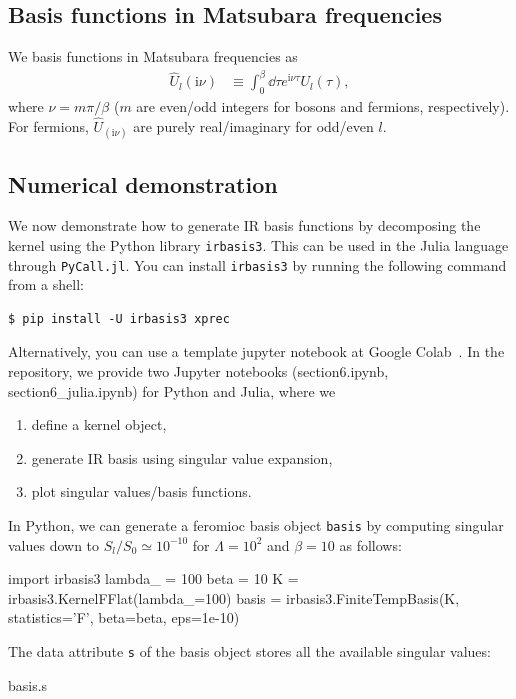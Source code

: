 \documentclass[submission, LectureNotes]{SciPost}
\newcommand\ii{\mathrm{i}}%
\newcommand\iv{\ii\nu}%
\begin{document}
\subsection{Basis functions in Matsubara frequencies}
We basis functions in Matsubara frequencies as
\begin{align}
    \hat{U}_l(\iv) &\equiv \int_0^\beta \dd \tau e^{\iv\tau} U_l(\tau),
\end{align}
where $\nu = m\pi/\beta$ ($m$ are even/odd integers for bosons and fermions, respectively).
For fermions, $\hat{U}_(\iv)$ are purely real/imaginary for odd/even $l$.

\subsection{Numerical demonstration}
We now demonstrate how to generate IR basis functions by decomposing the kernel using the Python library
\texttt{irbasis3}.
This can be used in the Julia language through \texttt{PyCall.jl}.
You can install \texttt{irbasis3} by running the following command from a shell:
\begin{verbatim}
$ pip install -U irbasis3 xprec
\end{verbatim}
Alternatively, you can use a template jupyter notebook at Google Colab~\cite{colab-template}.
In the repository, we provide two Jupyter notebooks (section6.ipynb, section6\_julia.ipynb)
for Python and Julia, where we
\begin{enumerate}
    \item define a kernel object,
    \item generate IR basis using singular value expansion,
    \item plot singular values/basis functions.
\end{enumerate}

In Python, we can generate a feromioc basis object \texttt{basis}
by computing singular values down to $S_l/S_0 \simeq 10^{-10}$
for $\Lambda=10^2$ and $\beta=10$ as follows:
\begin{python}
import irbasis3
lambda_ = 100
beta = 10
K = irbasis3.KernelFFlat(lambda_=100)
basis = irbasis3.FiniteTempBasis(K, statistics='F', beta=beta, eps=1e-10)
\end{python}

The data attribute \texttt{s} of the basis object
stores all the available singular values:
\begin{python}
 basis.s
\end{python}
\end{document}
